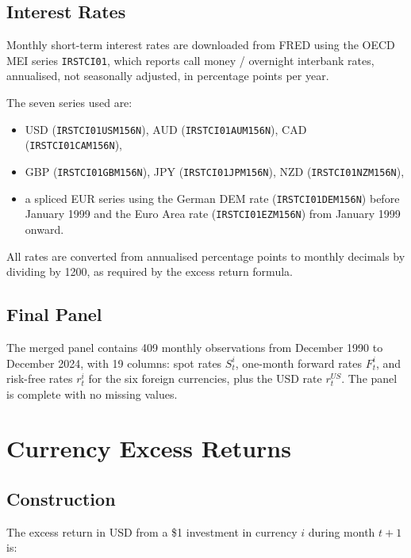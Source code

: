 \documentclass[a4paper,12pt]{article}
\begin{document}
\subsection{Interest Rates}

Monthly short-term interest rates are downloaded from FRED using the OECD MEI series
\texttt{IRSTCI01}, which reports call money / overnight interbank rates, annualised,
not seasonally adjusted, in percentage points per year.

The seven series used are:
\begin{itemize}
    \item USD (\texttt{IRSTCI01USM156N}), AUD (\texttt{IRSTCI01AUM156N}),
          CAD (\texttt{IRSTCI01CAM156N}),
    \item GBP (\texttt{IRSTCI01GBM156N}), JPY (\texttt{IRSTCI01JPM156N}),
          NZD (\texttt{IRSTCI01NZM156N}),
    \item a spliced EUR series using the German DEM rate
          (\texttt{IRSTCI01DEM156N}) before January 1999 and the Euro Area rate
          (\texttt{IRSTCI01EZM156N}) from January 1999 onward.
\end{itemize}

All rates are converted from annualised percentage points to monthly decimals by dividing
by 1200, as required by the excess return formula.

\subsection{Final Panel}

The merged panel contains 409 monthly observations from December 1990 to December 2024,
with 19 columns: spot rates $S^i_t$, one-month forward rates $F^i_t$, and risk-free rates
$r^i_t$ for the six foreign currencies, plus the USD rate $r^{US}_t$. The panel is
complete with no missing values.

\section{Currency Excess Returns}
\label{sec:excess}

\subsection{Construction}

The excess return in USD from a \$1 investment in currency $i$ during month $t+1$ is:
\end{document}
